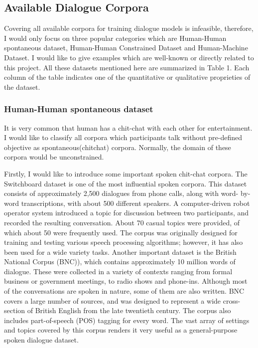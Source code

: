 \documentclass[bsc,frontabs,twoside,singlespacing,parskip,deptreport]{infthesis}     %
\begin{document}
\subsection{Available Dialogue Corpora}

Covering all available corpora for training dialogue models is infeasible, therefore, I would only focus on three popular categories which are Human-Human spontaneous dataset, Human-Human Constrained Dataset and Human-Machine Dataset. I would like to give examples which are well-known or directly related to this project. All these datasets mentioned here are summarized in Table 1. Each column of the table indicates one of the quantitative or qualitative proprieties of the dataset.


\subsubsection{Human-Human spontaneous dataset}

It is very common that human has a chit-chat with each other for entertainment. I would like to classify all corpora which participants talk without pre-defined objective as spontaneous(chitchat) corpora. Normally, the domain of these corpora would be unconstrained.

Firstly, I would like to introduce some important spoken chit-chat corpora. The Switchboard dataset\cite{godfrey1992switchboard} is one of the most influential spoken corpora. This dataset consists of approximately 2,500 dialogues from phone calls, along with word- by-word transcriptions, with about 500 different speakers. A computer-driven robot operator system introduced a topic for discussion between two participants, and recorded the resulting conversation. About 70 casual topics were provided, of which about 50 were frequently used. The corpus was originally designed for training and testing various speech processing algorithms; however, it has also been used for a wide variety tasks. Another important dataset is the British National Corpus (BNC)\cite{leech1992100}), which contains approximately 10 million words of dialogue. These were collected in a variety of contexts ranging from formal business or government meetings, to radio shows and phone-ins. Although most of the conversations are spoken in nature, some of them are also written. BNC covers a large number of sources, and was designed to represent a wide cross-section of British English from the late twentieth century. The corpus also includes part-of-speech (POS) tagging for every word. The vast array of settings and topics covered by this corpus renders it very useful as a general-purpose spoken dialogue dataset.
\end{document}

